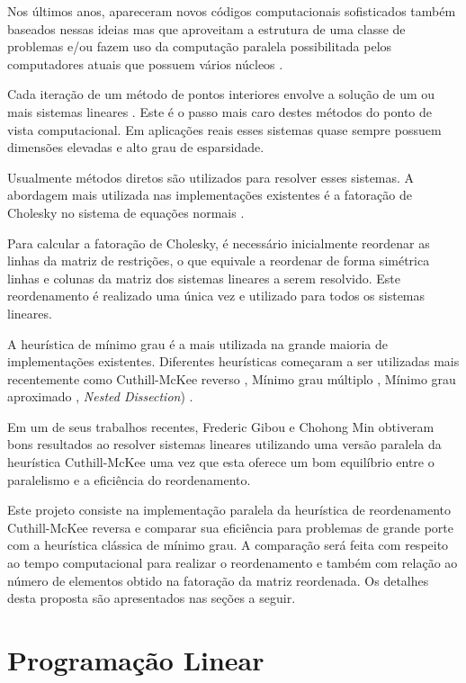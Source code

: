 \documentclass[12pt]{article}
\begin{document}
Nos últimos anos, apareceram novos códigos computacionais sofisticados também
baseados nessas ideias mas que aproveitam a estrutura de uma classe de problemas
e/ou fazem uso da computação paralela possibilitada pelos computadores atuais
que possuem vários núcleos \cite{karypis1994parallel,gondzio2006direct,gondzio2003parallel}.

Cada iteração de um método de pontos interiores envolve a solução
de um ou mais sistemas lineares \cite{Go96,LMS92,Me92b}. Este é o passo mais
caro destes métodos do ponto de vista computacional.
Em aplicações reais esses sistemas quase
sempre possuem dimensões elevadas e alto grau de esparsidade.

Usualmente métodos diretos são utilizados para resolver esses sistemas.
A abordagem mais utilizada nas implementações existentes é a fatoração
de Cholesky no sistema de equações normais \cite{ARVK89,CMWW96,Go96,LMS92}.

Para calcular a fatoração de Cholesky, é necessário inicialmente reordenar
as linhas da matriz de restrições, o que equivale a reordenar de forma
simétrica linhas e colunas da matriz dos sistemas lineares a serem resolvido.
Este reordenamento é realizado uma única vez e utilizado para todos os
sistemas lineares.

A heurística de mínimo grau \cite{GL89} é a mais utilizada na grande maioria de
implementações existentes. Diferentes heurísticas começaram a ser utilizadas
mais recentemente como Cuthill-McKee reverso \cite{CM69}, Mínimo grau
múltiplo \cite{Li85}, Mínimo grau aproximado \cite{ADD96}, {\it Nested
Dissection}) \cite{RH98}.

Em um de seus trabalhos recentes, Frederic Gibou e Chohong Min
\cite{gibou2012performance} obtiveram bons resultados ao resolver sistemas
lineares utilizando uma versão paralela da heurística Cuthill-McKee uma vez que
esta oferece um bom equilíbrio entre o paralelismo e a eficiência do
reordenamento.

Este projeto consiste na implementação paralela da heurística de reordenamento
Cuthill-McKee reversa e comparar sua eficiência para problemas de grande
porte com a heurística clássica de mínimo grau. A comparação será feita
com respeito ao tempo computacional para realizar o reordenamento e também
com relação ao número de elementos obtido na fatoração da matriz reordenada.
Os detalhes desta proposta são apresentados nas seções a seguir.

\section{Programação Linear}
\end{document}
